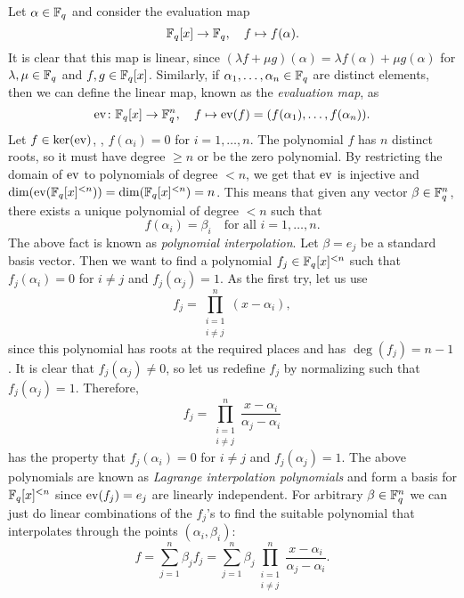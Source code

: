\documentclass[../main.tex]{subfiles}
\begin{document}
Let $\alpha \in \mathbb{F}_q$ and consider the evaluation map
\begin{equation*}
    \mathbb{F}_q[x] \to \mathbb{F}_q, \quad f \mapsto f(\alpha).
\end{equation*}
It is clear that this map is linear, since $(\lambda f + \mu g)(\alpha) = \lambda f(\alpha) + \mu g(\alpha)$ for $\lambda, \mu \in \mathbb{F}_q$ and $f, g \in \mathbb{F}_q[x]$. Similarly, if $\alpha_1, \dots, \alpha_n \in \mathbb{F}_q$ are distinct elements, then we can define the linear map, known as the \emph{evaluation map}, as
\begin{equation*}
    \operatorname{ev} \colon \mathbb{F}_q[x] \to \mathbb{F}_q^n, \quad f \mapsto \operatorname{ev}(f) = (f(\alpha_1), \dots, f(\alpha_n)).
\end{equation*}
Let $f \in \ker(\operatorname{ev})$, \ie, $f(\alpha_i) = 0$ for $i = 1, \dots, n$. The polynomial $f$ has $n$ distinct roots, so it must have degree $\geq n$ or be the zero polynomial. By restricting the domain of $\operatorname{ev}$ to polynomials of degree $< n$, we get that $\operatorname{ev}$ is injective and $\dim(\operatorname{ev}(\mathbb{F}_q[x]^{< n})) = \dim(\mathbb{F}_q[x]^{< n}) = n$. This means that given any vector $\beta \in \mathbb{F}_q^n$, there exists a unique polynomial of degree $< n$ such that
\begin{equation*}
    f(\alpha_i) = \beta_i \quad \text{for all $i = 1, \dots, n$}.
\end{equation*}
The above fact is known as \emph{polynomial interpolation}. Let $\beta = e_j$ be a standard basis vector. Then we want to find a polynomial $f_j \in \mathbb{F}_q[x]^{< n}$ such that $f_j(\alpha_i) = 0$ for $i \neq j$ and $f_j(\alpha_j) = 1$. As the first try, let us use
\begin{equation*}
    f_j = \prod_{\substack{i = 1 \\ i \neq j}}^n (x - \alpha_i),
\end{equation*}
since this polynomial has roots at the required places and has $\deg(f_j) = n - 1$. It is clear that $f_j(\alpha_j) \neq 0$, so let us redefine $f_j$ by normalizing such that $f_j(\alpha_j) = 1$. Therefore,
\begin{equation*}
    f_j = \prod_{\substack{i = 1 \\ i \neq j}}^n \frac{x - \alpha_i}{\alpha_j - \alpha_i}
\end{equation*}
has the property that $f_j(\alpha_i) = 0$ for $i \neq j$ and $f_j(\alpha_j) = 1$. The above polynomials are known as \emph{Lagrange interpolation polynomials} and form a basis for $\mathbb{F}_q[x]^{< n}$ since $\operatorname{ev}(f_j) = e_j$ are linearly independent. For arbitrary $\beta \in \mathbb{F}_q^n$ we can just do linear combinations of the $f_j$'s to find the suitable polynomial that interpolates through the points $(\alpha_i, \beta_i)$:
\begin{equation*}
    f = \sum_{j=1}^n \beta_j f_j = \sum_{j=1}^n \beta_j \prod_{\substack{i = 1 \\ i \neq j}}^n \frac{x - \alpha_i}{\alpha_j - \alpha_i}.
\end{equation*}
\end{document}
